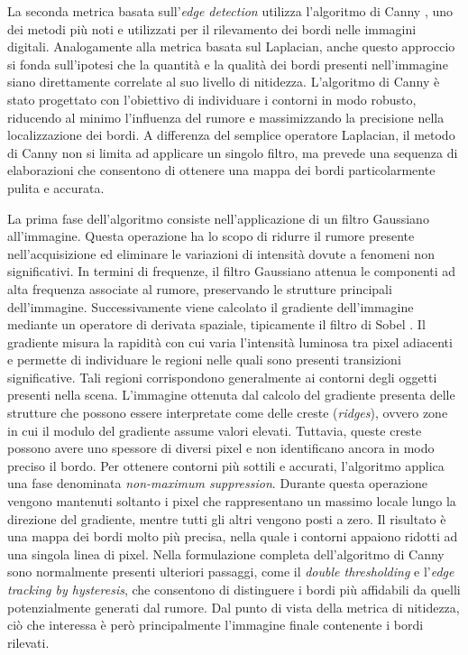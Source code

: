 \documentclass[
    target=bach,
    aauheader=,
    style=
]{thud}
\begin{document}
La seconda metrica basata sull'\textit{edge detection} utilizza l'algoritmo di Canny \cite{canny}, uno dei metodi più noti e utilizzati per il rilevamento dei bordi nelle immagini digitali. Analogamente alla metrica basata sul Laplacian, anche questo approccio si fonda sull'ipotesi che la quantità e la qualità dei bordi presenti nell'immagine siano direttamente correlate al suo livello di nitidezza. L'algoritmo di Canny è stato progettato con l'obiettivo di individuare i contorni in modo robusto, riducendo al minimo l'influenza del rumore e massimizzando la precisione nella localizzazione dei bordi. A differenza del semplice operatore Laplacian, il metodo di Canny non si limita ad applicare un singolo filtro, ma prevede una sequenza di elaborazioni che consentono di ottenere una mappa dei bordi particolarmente pulita e accurata.

La prima fase dell'algoritmo consiste nell'applicazione di un filtro Gaussiano all'immagine. Questa operazione ha lo scopo di ridurre il rumore presente nell'acquisizione ed eliminare le variazioni di intensità dovute a fenomeni non significativi. In termini di frequenze, il filtro Gaussiano attenua le componenti ad alta frequenza associate al rumore, preservando le strutture principali dell'immagine. Successivamente viene calcolato il gradiente dell'immagine mediante un operatore di derivata spaziale, tipicamente il filtro di Sobel \cite{sobel}. Il gradiente misura la rapidità con cui varia l'intensità luminosa tra pixel adiacenti e permette di individuare le regioni nelle quali sono presenti transizioni significative. Tali regioni corrispondono generalmente ai contorni degli oggetti presenti nella scena. L'immagine ottenuta dal calcolo del gradiente presenta delle strutture che possono essere interpretate come delle creste (\textit{ridges}), ovvero zone in cui il modulo del gradiente assume valori elevati. Tuttavia, queste creste possono avere uno spessore di diversi pixel e non identificano ancora in modo preciso il bordo. Per ottenere contorni più sottili e accurati, l'algoritmo applica una fase denominata \textit{non-maximum suppression}. Durante questa operazione vengono mantenuti soltanto i pixel che rappresentano un massimo locale lungo la direzione del gradiente, mentre tutti gli altri vengono posti a zero. Il risultato è una mappa dei bordi molto più precisa, nella quale i contorni appaiono ridotti ad una singola linea di pixel. Nella formulazione completa dell'algoritmo di Canny sono normalmente presenti ulteriori passaggi, come il \textit{double thresholding} e l'\textit{edge tracking by hysteresis}, che consentono di distinguere i bordi più affidabili da quelli potenzialmente generati dal rumore. Dal punto di vista della metrica di nitidezza, ciò che interessa è però principalmente l'immagine finale contenente i bordi rilevati.
\end{document}
